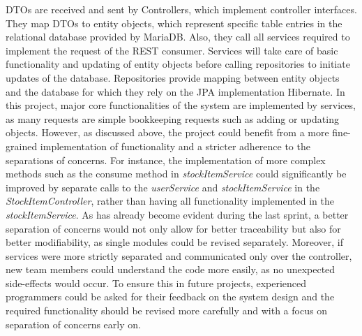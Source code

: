 DTOs are received and sent by Controllers, which implement controller interfaces. They map DTOs to entity objects, which represent specific table entries in the relational database provided by MariaDB. Also, they call all services required to implement the request of the REST consumer. Services will take care of basic functionality and updating of entity objects before calling repositories to initiate updates of the database. Repositories provide mapping between entity objects and the database for which they rely on the JPA implementation Hibernate. 
In this project, major core functionalities of the system are implemented by services, as many requests are simple bookkeeping requests such as adding or updating objects.
However, as discussed above, the project could benefit from a more fine-grained implementation of functionality and a stricter adherence to the separations of concerns. For instance, the implementation of more complex methods such as the consume method in \textit{stockItemService} could significantly be improved by separate calls to the \textit{userService} and \textit{stockItemService} in the\textit{ StockItemController}, rather than having all functionality implemented in the \textit{stockItemService}. 
As has already become evident during the last sprint, a better separation of concerns would not only allow for better traceability but also for better modifiability, as single modules could be revised separately. Moreover, if services were more strictly separated and communicated only over the controller, new team members could understand the code more easily, as no unexpected side-effects would occur. To ensure this in future projects, experienced programmers could be asked for their feedback on the system design and the required functionality should be revised more carefully and with a focus on separation of concerns early on.
